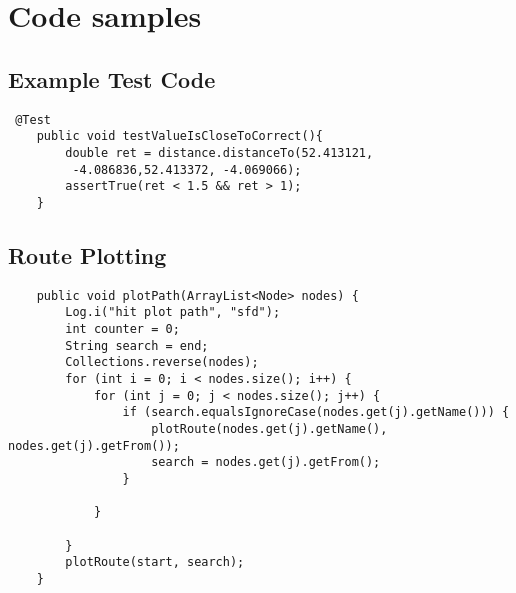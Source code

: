 \chapter{Code samples}
\section{Example Test Code}
\begin{lstlisting}
 @Test
    public void testValueIsCloseToCorrect(){
        double ret = distance.distanceTo(52.413121,
         -4.086836,52.413372, -4.069066);
        assertTrue(ret < 1.5 && ret > 1);
    }
\end{lstlisting}
\section{Route Plotting}
\begin{lstlisting}
    public void plotPath(ArrayList<Node> nodes) {
        Log.i("hit plot path", "sfd");
        int counter = 0;
        String search = end;
        Collections.reverse(nodes);
        for (int i = 0; i < nodes.size(); i++) {
            for (int j = 0; j < nodes.size(); j++) {
                if (search.equalsIgnoreCase(nodes.get(j).getName())) {
                    plotRoute(nodes.get(j).getName(), nodes.get(j).getFrom());
                    search = nodes.get(j).getFrom();
                }

            }

        }
        plotRoute(start, search);
    }
\end{lstlisting}
\newpage
